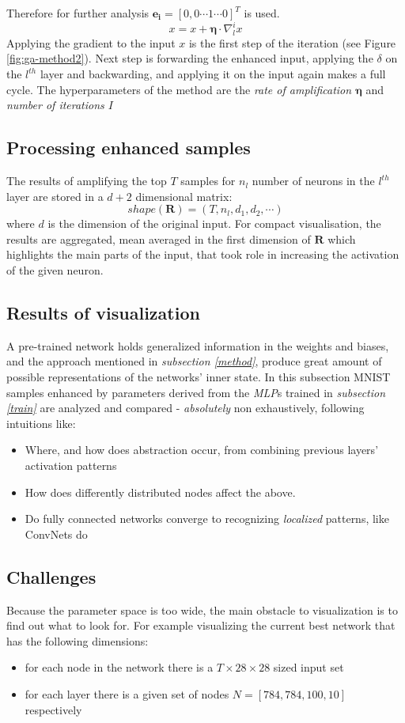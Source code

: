 Therefore for further analysis $\mathbf{e_i} = [0, 0 \cdots 1 \cdots 0]^T$ is used.
$$x = x + \mathbf{\eta}\cdot\nabla_l^i x$$
Applying the gradient to the input $x$ is the first step of the iteration (see Figure \ref{fig:ga-method2}). Next step is forwarding the enhanced input, applying the $\delta$ on the $l^{th}$ layer and backwarding, and applying it on the input again makes a full cycle.
The hyperparameters of the method are the \emph{rate of amplification $\mathbf{\eta}$} and \emph{number of iterations $I$}

\subsection{Processing enhanced samples}
The results of amplifying the top $T$ samples for $n_l$ number of neurons in the $l^{th}$ layer are stored in a $d + 2$ dimensional matrix:
$$
    shape(\mathbf{R}) = (T, n_l, d_1, d_2, \cdots)
$$
where $d$ is the dimension of the original input.
For compact visualisation, the results are aggregated, mean averaged in the first dimension of $\mathbf{R}$ which highlights the main parts of the input, that took role in increasing the activation of the given neuron.


\subsection{Results of visualization}

A pre-trained network holds generalized information in the weights and biases, and the approach mentioned in \emph{subsection \ref{method}}, produce great amount of possible representations of the networks' inner state. In this subsection MNIST samples enhanced by parameters derived from the \emph{MLP}s trained in \emph{subsection \ref{train}} are analyzed and compared - \textit{absolutely} non exhaustively, following intuitions like:

\begin{itemize}
    \item Where, and how does abstraction occur, from combining previous layers' activation patterns
    \item How does differently distributed nodes affect the above.
    \item Do fully connected networks converge to recognizing \emph{localized} patterns, like ConvNets do
\end{itemize}

\subsection{Challenges} Because the parameter space is too wide, the main obstacle to visualization is to find out what to look for. For example visualizing the current best network that has the following dimensions: 
\begin{itemize}
    \item for each node in the network there is a $T \times 28 \times 28$ sized input set
    \item for each layer there is a given set of nodes $N = [784, 784, 100, 10]$ respectively
\end{itemize}

